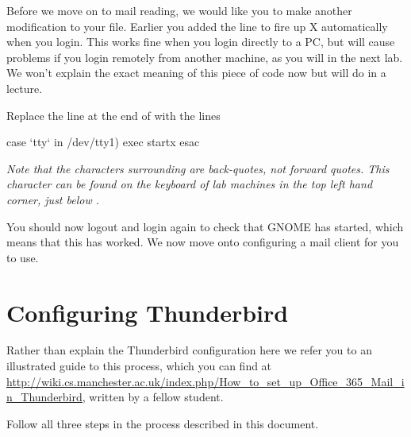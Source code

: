 Before we move on to mail reading, we would like you to make another modification to your  file. Earlier you added the line  to fire up X automatically when you login. This works fine when you login directly to a PC, but will cause problems if you login remotely from another machine, as you will in the next lab. We won't explain the exact meaning of this piece of code now but will do in a lecture.

Replace the line  at the end of  with the lines

\begin{ttoutenv}
case `tty` in
/dev/tty1) exec startx
esac 
\end{ttoutenv}

\emph{Note that the characters surrounding  are back-quotes, not forward quotes. This character can be found on the keyboard of lab machines in the top left hand corner, just below .}

You should now logout and login again to check that GNOME has started, which means that this has worked. We now move onto configuring a mail client for you to use.

\section{Configuring Thunderbird}


Rather than explain the Thunderbird configuration here we refer you to an illustrated guide to this process, which you can find at \url{http://wiki.cs.manchester.ac.uk/index.php/How_to_set_up_Office_365_Mail_in_Thunderbird}, written by a fellow student.

Follow all three steps in the process described in this document.

